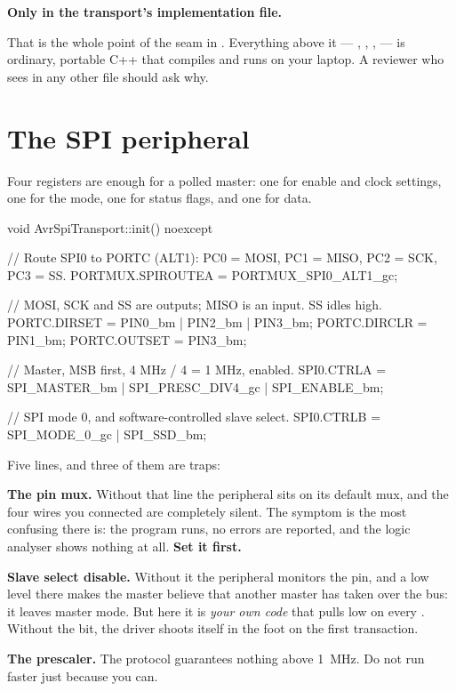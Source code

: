 \textbf{Only in the transport's implementation file.}

That is the whole point of the seam in . Everything above it --- ,
, ,  --- is ordinary, portable C++ that compiles and runs
on your laptop. A reviewer who sees  in any other file should ask why.

\section{The SPI peripheral}
\label{sec:periph}

Four registers are enough for a polled master: one for enable and clock settings, one for the
mode, one for status flags, and one for data.

\begin{cppcode}
void AvrSpiTransport::init() noexcept
{
    // Route SPI0 to PORTC (ALT1): PC0 = MOSI, PC1 = MISO, PC2 = SCK, PC3 = SS.
    PORTMUX.SPIROUTEA = PORTMUX_SPI0_ALT1_gc;

    // MOSI, SCK and SS are outputs; MISO is an input. SS idles high.
    PORTC.DIRSET = PIN0_bm | PIN2_bm | PIN3_bm;
    PORTC.DIRCLR = PIN1_bm;
    PORTC.OUTSET = PIN3_bm;

    // Master, MSB first, 4 MHz / 4 = 1 MHz, enabled.
    SPI0.CTRLA = SPI_MASTER_bm | SPI_PRESC_DIV4_gc | SPI_ENABLE_bm;

    // SPI mode 0, and software-controlled slave select.
    SPI0.CTRLB = SPI_MODE_0_gc | SPI_SSD_bm;
}
\end{cppcode}

Five lines, and three of them are traps:

\textbf{The pin mux.} Without that line the peripheral sits on its default mux, and the four wires
you connected are completely silent. The symptom is the most confusing there is: the program runs,
no errors are reported, and the logic analyser shows nothing at all. \textbf{Set it first.}

\textbf{Slave select disable.} Without it the peripheral monitors the  pin, and a low
level there makes the master believe that another master has taken over the bus: it leaves master
mode. But here it is \emph{your own code} that pulls  low on every .
Without the bit, the driver shoots itself in the foot on the first transaction.

\textbf{The prescaler.} The protocol guarantees nothing above 1~MHz. Do not run faster just
because you can.




